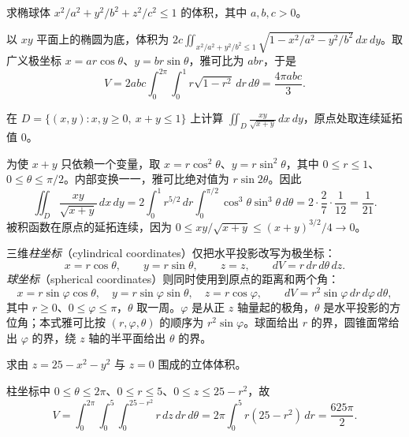 \documentclass[UTF8,12pt,a4paper,fontset=fandol]{ctexbook}
\begin{document}
\begin{example}
\label{ex:multiple-ellipsoid-volume}
求椭球体 $x^2/a^2+y^2/b^2+z^2/c^2\leq1$ 的体积，其中 $a,b,c>0$。
\end{example}
\begin{solve}
以 $xy$ 平面上的椭圆为底，体积为 $2c\iint_{x^2/a^2+y^2/b^2\leq1}\sqrt{1-x^2/a^2-y^2/b^2}\,dx\,dy$。取广义极坐标 $x=ar\cos\theta$、$y=br\sin\theta$，雅可比为 $abr$，于是
\[
    V=2abc\int_0^{2\pi}\int_0^1r\sqrt{1-r^2}\,dr\,d\theta
    =\frac{4\pi abc}{3}.
\]
\end{solve}

\begin{example}
\label{ex:multiple-simplex-squared-angle}
在 $D=\{(x,y):x,y\geq0,\ x+y\leq1\}$ 上计算 $\displaystyle\iint_D\frac{xy}{\sqrt{x+y}}\,dx\,dy$，原点处取连续延拓值 $0$。
\end{example}
\begin{solve}
为使 $x+y$ 只依赖一个变量，取 $x=r\cos^2\theta$、$y=r\sin^2\theta$，其中 $0\leq r\leq1$、$0\leq\theta\leq\pi/2$。内部变换一一，雅可比绝对值为 $r\sin2\theta$。因此
\[
    \iint_D\frac{xy}{\sqrt{x+y}}\,dx\,dy
    =2\int_0^1r^{5/2}\,dr\int_0^{\pi/2}\cos^3\theta\sin^3\theta\,d\theta
    =2\cdot\frac27\cdot\frac1{12}=\frac1{21}.
\]
被积函数在原点的延拓连续，因为 $0\leq xy/\sqrt{x+y}\leq(x+y)^{3/2}/4\to0$。
\end{solve}

三维\emph{柱坐标}（cylindrical coordinates）仅把水平投影改写为极坐标：
\begin{equation}
    x=r\cos\theta,\qquad y=r\sin\theta,\qquad z=z,
    \qquad dV=r\,dr\,d\theta\,dz.
    \label{eq:multiple-cylindrical-coordinates}
\end{equation}
\emph{球坐标}（spherical coordinates）则同时使用到原点的距离和两个角：
\begin{equation}
    x=r\sin\varphi\cos\theta,\quad
    y=r\sin\varphi\sin\theta,\quad z=r\cos\varphi,
    \qquad dV=r^2\sin\varphi\,dr\,d\varphi\,d\theta,
    \label{eq:multiple-spherical-coordinates}
\end{equation}
其中 $r\geq0$、$0\leq\varphi\leq\pi$，$\theta$ 取一周。$\varphi$ 是从正 $z$ 轴量起的极角，$\theta$ 是水平投影的方位角；本式雅可比按 $(r,\varphi,\theta)$ 的顺序为 $r^2\sin\varphi$。球面给出 $r$ 的界，圆锥面常给出 $\varphi$ 的界，绕 $z$ 轴的半平面给出 $\theta$ 的界。

\begin{example}
\label{ex:multiple-paraboloid-volume}
求由 $z=25-x^2-y^2$ 与 $z=0$ 围成的立体体积。
\end{example}
\begin{solve}
柱坐标中 $0\leq\theta\leq2\pi$、$0\leq r\leq5$、$0\leq z\leq25-r^2$，故
\[
    V=\int_0^{2\pi}\int_0^5\int_0^{25-r^2}r\,dz\,dr\,d\theta
    =2\pi\int_0^5r(25-r^2)\,dr=\frac{625\pi}{2}.
\]
\end{solve}
\end{document}
